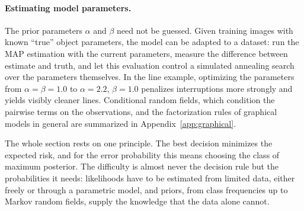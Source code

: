 \paragraph{Estimating model parameters.}
The prior parameters $\alpha$ and $\beta$ need not be guessed. Given training
images with known ``true'' object parameters, the model can be adapted to a
dataset: run the MAP estimation with the current parameters, measure the
difference between estimate and truth, and let this evaluation control a
simulated annealing search over the parameters themselves. In the line
example, optimizing the parameters from $\alpha = \beta = 1.0$ to
$\alpha = 2.2$, $\beta = 1.0$ penalizes interruptions more strongly and yields
visibly cleaner lines. Conditional random fields, which condition the pairwise
terms on the observations, and the factorization rules of graphical models in
general are summarized in Appendix~\ref{app:graphical}.

The whole section rests on one principle. The best decision minimizes the
expected risk, and for the error probability this means choosing the class of
maximum posterior. The difficulty is almost never the decision rule but the
probabilities it needs: likelihoods have to be estimated from limited data,
either freely or through a parametric model, and priors, from class
frequencies up to Markov random fields, supply the knowledge that the data
alone cannot.
